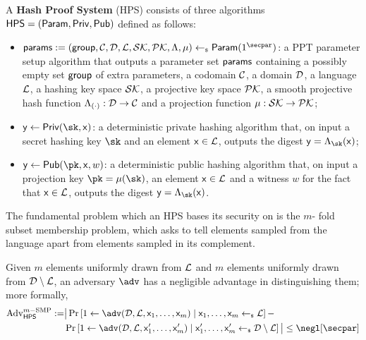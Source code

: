 \begin{definition}
	A \textbf{Hash Proof System} (HPS) consists of three algorithms ${\mathsf{HPS}} = ({\mathsf{Param}},{\mathsf{Priv}},{\mathsf{Pub}})$ defined as follows:
	\begin{itemize}
		\item $\HPSparams: = (\HPSgroup,\Codomain,\Domain,\Language,\SKSpace,\PKSpace,\HPSHash,\projectKey)  \getsr \HPSParam (1^\secpar)$: a PPT parameter setup algorithm that outputs a parameter set ${\mathsf{params}}$ containing a possibly empty set ${\mathsf{group}}$ of extra parameters, a codomain $\mathcal{C}$, a domain $\mathcal{D}$, a language $\mathcal{L}$, a hashing key space $\mathcal{SK}$, a projective key space $\mathcal{PK}$, a smooth projective hash function $\Lambda_{(\cdot)}: \mathcal{D} \rightarrow \mathcal{C}$ and a projection function $\mu: \mathcal{SK} \rightarrow \mathcal{PK}$;
		\item $\y \gets \HPSPrivEval (\sk,\x)$: a deterministic private hashing algorithm that, on input a secret hashing key $\sk$ and an element ${\mathsf{x}} \in \mathcal{L}$, outputs the digest $\y = \HPSHash_\sk(\x)$;
		\item $\y \gets \HPSPubEval (\pk,\x,w)$: a deterministic public hashing algorithm that, on input a projection key $\pk = \mu(\sk)$, an element ${\mathsf{x}} \in \mathcal{L}$ and a witness $w$ for the fact that ${\mathsf{x}} \in \mathcal{L}$, outputs the digest $\y = \HPSHash_\sk(\x)$.
	\end{itemize}
\end{definition}

The fundamental problem which an HPS bases its security on is the $m$- fold subset membership problem, which asks to tell elements sampled from the language apart from elements sampled in its complement.
\begin{problem}
	Given $m$ elements uniformly drawn from $\mathcal{L}$ and $m$ elements uniformly drawn from $\mathcal{D} \setminus \mathcal{L}$, an adversary $\adv$ has a negligible advantage in distinguishing them; more formally,
	\begin{align*} \AdvSMP :=  & \big| \Pr \left[ 1 \gets \adv(\Domain,\Language,\x_1,\dots,\x_m )  \mid \x_1,\dots,\x_m \getsr \Language \right] - \\
		&\Pr \left[ 1 \gets \adv(\Domain,\Language,\x_1',\dots,\x_m' )  \mid \x_1',\dots,\x_m' \getsr \Domain \setminus \Language \right] \big| \leq \negl[\secpar] 
		\end{align*}
\end{problem}

